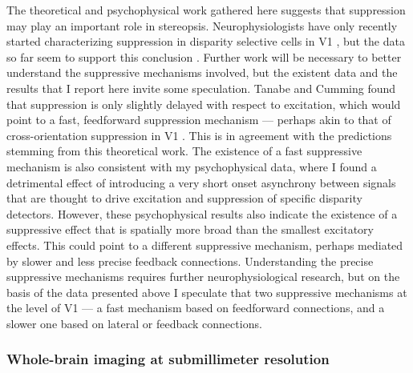 The theoretical and psychophysical work gathered here suggests that suppression may play an important role in stereopsis. Neurophysiologists have only recently started characterizing suppression in disparity selective cells in V1 \cite{Tanabe:2011pt,Tanabe:2014ud}, but the data so far seem to support this conclusion \cite{Tanabe:2011pt}. Further work will be necessary to better understand the suppressive mechanisms involved, but the existent data and the results that I report here invite some speculation. Tanabe and Cumming found that suppression is only slightly delayed with respect to excitation, which would point to a fast, feedforward suppression mechanism --- perhaps akin to that of cross-orientation suppression in V1 \cite{Smith:2006uq}. This is in agreement with the predictions stemming from this theoretical work. The existence of a fast suppressive mechanism is also consistent with my psychophysical data, where I found a detrimental effect of introducing a very short onset asynchrony between signals that are thought to drive excitation and suppression of specific disparity detectors. However, these psychophysical results also indicate the existence of a suppressive effect that is spatially more broad than the smallest excitatory effects. This could point to a different suppressive mechanism, perhaps mediated by slower and less precise feedback connections. Understanding the precise suppressive mechanisms requires further neurophysiological research, but on the basis of the data presented above I speculate that two suppressive mechanisms at the level of V1 --- a fast mechanism based on feedforward connections, and a slower one based on lateral or feedback connections.


\subsubsection*{Whole-brain imaging at submillimeter resolution}

